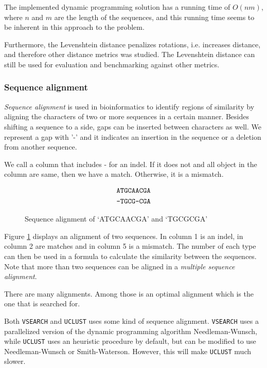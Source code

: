 The implemented dynamic programming solution has a running time of $O(nm)$,
where $n$ and $m$ are the length of the sequences, and this running time seems
to be inherent in this approach to the problem.


Furthermore, the Levenshtein distance penalizes rotations, i.e. increases
distance, and therefore other distance metrics was studied. The Levenshtein
distance can still be used for evaluation and benchmarking against other
metrics.


\subsubsection{Sequence alignment}
\emph{Sequence alignment} is used in bioinformatics to identify regions of
similarity by aligning the characters of two or more sequences in a certain
manner. Besides shifting a sequence to a side, gaps can be inserted between
characters as well.  We represent a gap with '-' and it indicates an insertion
in the sequence or a deletion from another sequence.

We call a column that includes - for an indel. If it does not and all object in
the column are same, then we have a match. Otherwise, it is a mismatch.

\begin{figure}[H]
  \centering
  \begin{align*}
    \mbox{\texttt{ATGCAACGA}} \\
    \mbox{\texttt{-TGCG-CGA}}
  \end{align*}
  \caption{Sequence alignment of `ATGCAACGA' and `TGCGCGA'}
  \label{fig:seqAlignment}
\end{figure}

Figure \ref{fig:seqAlignment} displays an alignment of two sequences. In column
1 is an indel, in column 2 are matches and in column 5 is a mismatch.  The
number of each type can then be used in a formula to calculate the similarity
between the sequences. Note that more than two sequences can be aligned in a
\emph{multiple sequence alignment}.

There are many alignments. Among those is an optimal alignment which is the one
that is searched for.

Both \texttt{VSEARCH} and \texttt{UCLUST} uses some kind of sequence alignment.
\texttt{VSEARCH} uses a parallelized version of the dynamic programming
algorithm Needleman-Wunsch, while \texttt{UCLUST} uses an heuristic procedure
by default, but can be modified to use Needleman-Wunsch or Smith-Waterson.
However, this will make \texttt{UCLUST} much slower.


